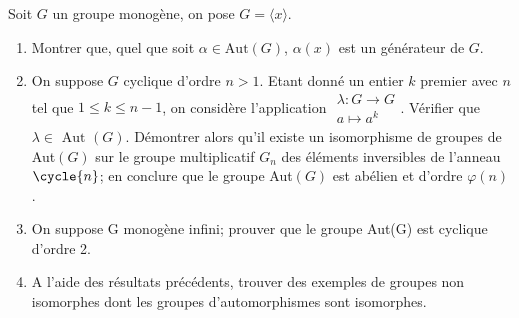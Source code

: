 Soit $G$ un groupe monogène, on pose $G = \langle x \rangle$.

\begin{enumerate}[label=\alph*)]
    \item Montrer que, quel que soit $\alpha \in \text{Aut}(G)$, $\alpha(x)$ est un générateur de $G$.
    \item On suppose $G$ cyclique d'ordre $n>1$. Etant donné un entier $k$ premier avec $n$ tel que $1\leq k \leq n-1$, on considère l'application $\begin{array}{rl}
    \lambda : G \rightarrow G\\
 a \mapsto a^k
\end{array}$. Vérifier que $\lambda \in \text{ Aut } (G)$. Démontrer alors qu'il existe un isomorphisme de groupes de Aut$(G)$ sur le groupe multiplicatif $G_n$ des éléments inversibles de l'anneau $\cycle{n}$; en conclure que le groupe Aut$(G)$ est abélien et d'ordre $\varphi(n)$.
        \item On suppose G monogène infini; prouver que le groupe Aut(G) est cyclique d'ordre 2.
    \item  A l'aide des résultats précédents, trouver des exemples de groupes non isomorphes dont les groupes d'automorphismes sont isomorphes.
\end{enumerate}